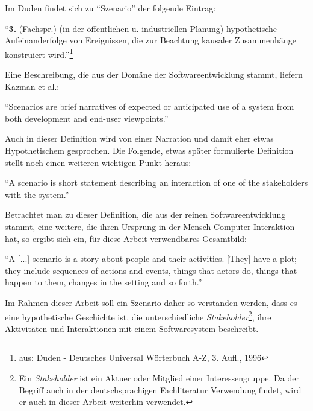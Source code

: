   Im Duden findet sich zu "`Szenario"' der folgende Eintrag:
  
  \begin{definition}\label{def:szenario_allg}
    "`\textbf{3.} (Fachspr.) (in der öffentlichen u. industriellen Planung) hypothetische Aufeinanderfolge von Ereignissen, die zur Beachtung kausaler Zusammenhänge konstruiert wird."'\footnote{aus: Duden - Deutsches Universal Wörterbuch A-Z, 3. Aufl., 1996}
  \end{definition}
  
  Eine Beschreibung, die aus der Domäne der Softwareentwicklung stammt, liefern Kazman et al.:
  
  \begin{definition}\label{def:szenario_kazman_et_al}
    "`Scenarios are brief narratives of expected or anticipated use of a system from both development and end-user viewpoints."'~\emph{\citep[S. 2]{scenario_based_analysis_of_software_architecture}}
  \end{definition}
  
  Auch in dieser Definition wird von einer Narration und damit eher etwas Hypothetischem gesprochen. Die Folgende, etwas später formulierte Definition stellt noch einen weiteren wichtigen Punkt heraus:
  
  \begin{definition}\label{def:szenario_clements_et_al}
    "`A scenario is short statement describing an interaction of one of the stakeholders with the system."'~\emph{\citep[S. 33]{evaluating_software_architectures}}
  \end{definition}
  
  Betrachtet man zu dieser Definition, die aus der reinen Softwareentwicklung stammt, eine weitere, die ihren Ursprung in der Mensch-Computer-Interaktion hat, so ergibt sich ein, für diese Arbeit verwendbares Gesamtbild:
  
  \begin{definition}\label{def:szenario_carroll_rosson}
    "`A [...] scenario is a story about people and their activities. [They] have a plot; they include sequences of actions and events, things that actors do, things that happen to them, changes in the setting and so forth."'~\emph{\citep[S. 16/18]{scenario_based_development}}
  \end{definition}
  
  Im Rahmen dieser Arbeit soll ein Szenario daher so verstanden werden, dass es eine hypothetische Geschichte ist, die unterschiedliche \emph{Stakeholder}\footnote{Ein \emph{Stakeholder} ist ein Aktuer oder Mitglied einer Interessengruppe. Da der Begriff auch in der deutschsprachigen Fachliteratur Verwendung findet, wird er auch in dieser Arbeit weiterhin verwendet.}, ihre Aktivitäten und Interaktionen mit einem Softwaresystem beschreibt.
  
